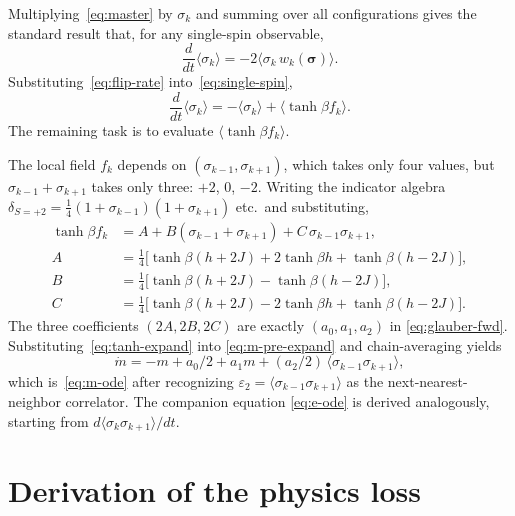 \documentclass[conference]{IEEEtran}
\newcommand{\epstwo}{\varepsilon_2}
\begin{document}
Multiplying~\eqref{eq:master} by $\sigma_k$ and summing over all
configurations gives the standard result that, for any single-spin
observable,
\begin{equation}
  \frac{d}{dt}\langle \sigma_k \rangle
    = -2 \langle \sigma_k\, w_k(\boldsymbol{\sigma}) \rangle.
  \label{eq:single-spin}
\end{equation}
Substituting~\eqref{eq:flip-rate} into~\eqref{eq:single-spin},
\begin{equation}
  \frac{d}{dt}\langle \sigma_k \rangle
    = -\langle \sigma_k \rangle + \langle \tanh \beta f_k \rangle.
  \label{eq:m-pre-expand}
\end{equation}
The remaining task is to evaluate $\langle \tanh \beta f_k \rangle$.


The local field $f_k$ depends on $(\sigma_{k-1}, \sigma_{k+1})$, which
takes only four values, but $\sigma_{k-1} + \sigma_{k+1}$ takes only
three: $+2$, $0$, $-2$. Writing the indicator algebra
$\delta_{S=+2} = \tfrac{1}{4}(1+\sigma_{k-1})(1+\sigma_{k+1})$ etc.\
and substituting,
\begin{align}
  \tanh\beta f_k
    &= A + B(\sigma_{k-1} + \sigma_{k+1}) + C\,\sigma_{k-1}\sigma_{k+1}, \nonumber \\
  A &= \tfrac{1}{4}\bigl[\tanh\beta(h+2J) + 2\tanh\beta h + \tanh\beta(h-2J)\bigr], \nonumber \\
  B &= \tfrac{1}{4}\bigl[\tanh\beta(h+2J) - \tanh\beta(h-2J)\bigr], \label{eq:tanh-expand} \\
  C &= \tfrac{1}{4}\bigl[\tanh\beta(h+2J) - 2\tanh\beta h + \tanh\beta(h-2J)\bigr]. \nonumber
\end{align}
The three coefficients $(2A, 2B, 2C)$ are exactly $(a_0, a_1, a_2)$ in
\eqref{eq:glauber-fwd}. Substituting~\eqref{eq:tanh-expand} into
\eqref{eq:m-pre-expand} and chain-averaging yields
\begin{equation}
  \dot m = -m + a_0/2 + a_1 m + (a_2/2)\,\langle \sigma_{k-1}\sigma_{k+1}\rangle,
\end{equation}
which is~\eqref{eq:m-ode} after recognizing
$\epstwo = \langle \sigma_{k-1}\sigma_{k+1}\rangle$ as the
next-nearest-neighbor correlator. The companion equation
\eqref{eq:e-ode} is derived analogously, starting from
$d\langle \sigma_k \sigma_{k+1}\rangle/dt$.

\section{Derivation of the physics loss}
\label{app:phys-loss}
\end{document}
